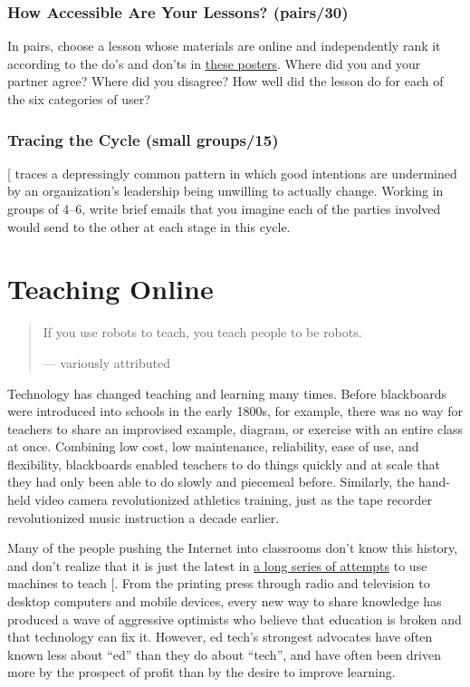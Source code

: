 \subsection{How Accessible Are Your Lessons? (pairs/30)}\label{how-accessible-are-your-lessons-pairs30}

In pairs, choose a lesson whose materials are online and independently
rank it according to the do's and don'ts in \href{https://accessibility.blog.gov.uk/2016/09/02/dos-and-donts-on-designing-for-accessibility/}{these
posters}. Where did you and your partner
agree? Where did you disagree? How well did the lesson do for each of
the six categories of user?

\subsection{Tracing the Cycle (small groups/15)}\label{tracing-the-cycle-small-groups15}

{[}\protect[\hyperlink{b:Coco2018}{Coco2018}]{]} traces a depressingly common pattern in which good
intentions are undermined by an organization's leadership being
unwilling to actually change. Working in groups of 4--6, write brief
emails that you imagine each of the parties involved would send to the
other at each stage in this cycle.

\chapter{Teaching Online}\label{s:online}

\begin{quote}\setlength{\parindent}{0pt}
If you use robots to teach, you teach people to be robots.

--- variously attributed
\end{quote}

Technology has changed teaching and learning many times. Before
blackboards were introduced into schools in the early 1800s, for
example, there was no way for teachers to share an improvised example,
diagram, or exercise with an entire class at once. Combining low cost,
low maintenance, reliability, ease of use, and flexibility, blackboards
enabled teachers to do things quickly and at scale that they had only
been able to do slowly and piecemeal before. Similarly, the hand-held
video camera revolutionized athletics training, just as the tape
recorder revolutionized music instruction a decade earlier.

Many of the people pushing the Internet into classrooms don't know
this history, and don't realize that it is just the latest in \href{http://teachingmachin.es/timeline.html}{a long
series of attempts} to use machines to teach
{[}\protect[\hyperlink{b:Watt2014}{Watt2014}]{]}. From the printing press through radio and
television to desktop computers and mobile devices, every new way to
share knowledge has produced a wave of aggressive optimists who
believe that education is broken and that technology can fix
it. However, ed tech's strongest advocates have often known less about
``ed'' than they do about ``tech'', and have often been driven more by the
prospect of profit than by the desire to improve learning.

